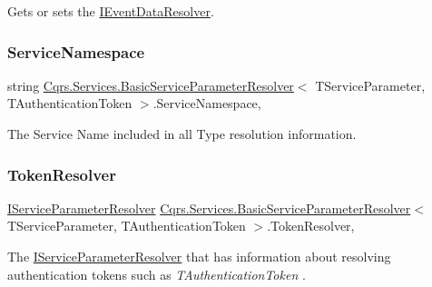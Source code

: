 Gets or sets the \hyperlink{interfaceCqrs_1_1Services_1_1IEventDataResolver}{I\+Event\+Data\+Resolver}. 

\mbox{\label{classCqrs_1_1Services_1_1BasicServiceParameterResolver_a78d53a2ee367086bca9f2d2118746836_a78d53a2ee367086bca9f2d2118746836}} 
\subsubsection{\texorpdfstring{Service\+Namespace}{ServiceNamespace}}
{\footnotesize\ttfamily string \hyperlink{classCqrs_1_1Services_1_1BasicServiceParameterResolver}{Cqrs.\+Services.\+Basic\+Service\+Parameter\+Resolver}$<$ T\+Service\+Parameter, T\+Authentication\+Token $>$.Service\+Namespace\hspace{0.3cm}{\ttfamily [get]}, {\ttfamily [protected]}}



The Service Name included in all Type resolution information. 

\mbox{\label{classCqrs_1_1Services_1_1BasicServiceParameterResolver_a0ed208048d0f925dfa1e14fb73d82f0b_a0ed208048d0f925dfa1e14fb73d82f0b}} 
\subsubsection{\texorpdfstring{Token\+Resolver}{TokenResolver}}
{\footnotesize\ttfamily \hyperlink{interfaceCqrs_1_1Services_1_1IServiceParameterResolver}{I\+Service\+Parameter\+Resolver} \hyperlink{classCqrs_1_1Services_1_1BasicServiceParameterResolver}{Cqrs.\+Services.\+Basic\+Service\+Parameter\+Resolver}$<$ T\+Service\+Parameter, T\+Authentication\+Token $>$.Token\+Resolver\hspace{0.3cm}{\ttfamily [get]}, {\ttfamily [protected]}}



The \hyperlink{interfaceCqrs_1_1Services_1_1IServiceParameterResolver}{I\+Service\+Parameter\+Resolver} that has information about resolving authentication tokens such as {\itshape T\+Authentication\+Token} . 

